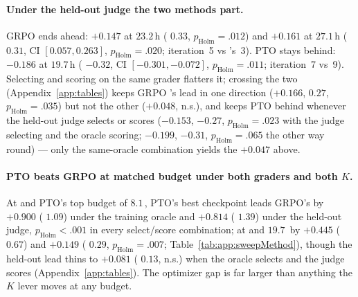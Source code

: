 \paragraph{Under the held-out judge the two methods part.} GRPO \Kf{} ends ahead: $+0.147$ at
$23.2$\,h (\dz{} $0.33$, $p_{\text{Holm}}{=}.012$) and $+0.161$ at $27.1$\,h (\dz{} $0.31$, CI
$[0.057, 0.263]$, $p_{\text{Holm}}{=}.020$; iteration~5 vs \Kz{}'s~3). PTO \Kf{} stays behind:
$-0.186$ at $19.7$\,h (\dz{} $-0.32$, CI $[-0.301, -0.072]$, $p_{\text{Holm}}{=}.011$;
iteration~7 vs~9). Selecting and scoring on the same grader flatters it; crossing the two
(Appendix~\ref{app:tables}) keeps GRPO \Kf{}'s lead in one direction ($+0.166$, \dz{} $0.27$,
$p_{\text{Holm}}{=}.035$) but not the other ($+0.048$, n.s.), and keeps PTO \Kf{} behind
whenever the held-out judge selects or scores ($-0.153$, \dz{} $-0.27$,
$p_{\text{Holm}}{=}.023$ with the judge selecting and the oracle scoring; $-0.199$, \dz{}
$-0.31$, $p_{\text{Holm}}{=}.065$ the other way round) --- only the same-oracle combination
yields the $+0.047$ above.

\paragraph{PTO beats GRPO at matched budget under both graders and both $K$.} At \Kz{} and PTO's
top budget of $8.1$\,\gpuh{}, PTO's best checkpoint leads GRPO's by $+0.900$ (\dz{} $1.09$)
under the training oracle and $+0.814$ (\dz{} $1.39$) under the held-out judge,
$p_{\text{Holm}}{<}.001$ in every select/score combination; at \Kf{} and $19.7$\,\gpuh{} by
$+0.445$ (\dz{} $0.67$) and $+0.149$ (\dz{} $0.29$,
$p_{\text{Holm}}{=}.007$; Table~\ref{tab:app:sweepMethod}), though the \Kf{} held-out lead thins
to $+0.081$ (\dz{} $0.13$, n.s.) when the oracle selects and the judge scores
(Appendix~\ref{app:tables}). The optimizer gap is far larger than anything the $K$ lever moves
at any budget.
